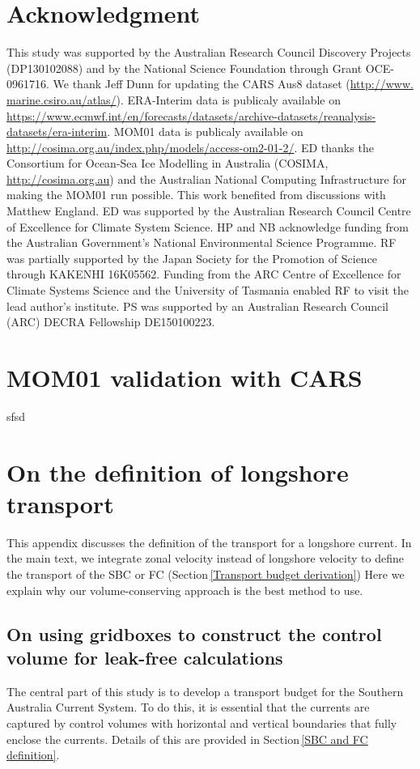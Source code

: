 \documentclass[preprint,3p,review,12pt]{elsarticle}
\begin{document}
\section{Acknowledgment}
This study was supported by the Australian Research Council Discovery Projects (DP130102088) and by the National Science Foundation through Grant OCE-0961716. We thank Jeff Dunn for updating the CARS Aus8 dataset (\url{http://www. marine.csiro.au/atlas/}). ERA-Interim data is publicaly available on \url{https://www.ecmwf.int/en/forecasts/datasets/archive-datasets/reanalysis-datasets/era-interim}. MOM01 data is publicaly available on \url{http://cosima.org.au/index.php/models/access-om2-01-2/}. ED thanks the Consortium for Ocean-Sea Ice Modelling in Australia (COSIMA, \url{http://cosima.org.au}) and the Australian National Computing Infrastructure for making the MOM01 run possible. This work benefited from discussions with Matthew England. ED was supported by the Australian Research Council Centre of Excellence for Climate System Science. HP and NB acknowledge funding from the Australian Government's National Environmental Science Programme. RF was partially supported by the Japan Society for the Promotion of Science through KAKENHI 16K05562.
Funding
  from the ARC Centre of Excellence for Climate Systems Science
  and the University of Tasmania enabled RF to visit the lead author's
  institute.
PS was supported by an Australian Research Council (ARC) DECRA Fellowship DE150100223.

\appendix
\setcounter{figure}{0}

\section{MOM01 validation with CARS} \label{MOM01 validation with CARS}
sfsd


\section{On the definition of longshore transport} \label{Reasoning for defining the SBC transport and the FC transport from their zonal transport}
This appendix discusses the definition of the transport for a longshore current. In the main text, we integrate zonal velocity instead of longshore velocity to define the transport of the SBC or FC (Section\,\ref{Transport budget derivation}) Here we explain why our volume-conserving approach is the best method to use.

\subsection{On using gridboxes to construct the control volume for leak-free calculations}
The central part of this study is to develop a transport budget for the Southern Australia Current System. To do this, it is essential that the currents are captured by control volumes with horizontal and vertical boundaries that fully enclose the currents. Details of this are provided in Section\,\ref{SBC and FC definition}.
\end{document}
